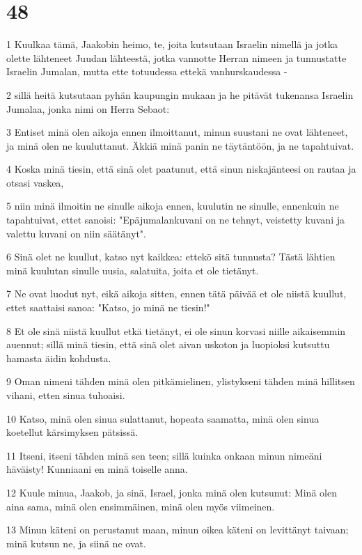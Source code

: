 \chapter{48}

\par 1 Kuulkaa tämä, Jaakobin heimo, te, joita kutsutaan Israelin nimellä ja jotka olette lähteneet Juudan lähteestä, jotka vannotte Herran nimeen ja tunnustatte Israelin Jumalan, mutta ette totuudessa ettekä vanhurskaudessa -
\par 2 sillä heitä kutsutaan pyhän kaupungin mukaan ja he pitävät tukenansa Israelin Jumalaa, jonka nimi on Herra Sebaot:
\par 3 Entiset minä olen aikoja ennen ilmoittanut, minun suustani ne ovat lähteneet, ja minä olen ne kuuluttanut. Äkkiä minä panin ne täytäntöön, ja ne tapahtuivat.
\par 4 Koska minä tiesin, että sinä olet paatunut, että sinun niskajänteesi on rautaa ja otsasi vaskea,
\par 5 niin minä ilmoitin ne sinulle aikoja ennen, kuulutin ne sinulle, ennenkuin ne tapahtuivat, ettet sanoisi: "Epäjumalankuvani on ne tehnyt, veistetty kuvani ja valettu kuvani on niin säätänyt".
\par 6 Sinä olet ne kuullut, katso nyt kaikkea: ettekö sitä tunnusta? Tästä lähtien minä kuulutan sinulle uusia, salatuita, joita et ole tietänyt.
\par 7 Ne ovat luodut nyt, eikä aikoja sitten, ennen tätä päivää et ole niistä kuullut, ettet saattaisi sanoa: "Katso, jo minä ne tiesin!"
\par 8 Et ole sinä niistä kuullut etkä tietänyt, ei ole sinun korvasi niille aikaisemmin auennut; sillä minä tiesin, että sinä olet aivan uskoton ja luopioksi kutsuttu hamasta äidin kohdusta.
\par 9 Oman nimeni tähden minä olen pitkämielinen, ylistykseni tähden minä hillitsen vihani, etten sinua tuhoaisi.
\par 10 Katso, minä olen sinua sulattanut, hopeata saamatta, minä olen sinua koetellut kärsimyksen pätsissä.
\par 11 Itseni, itseni tähden minä sen teen; sillä kuinka onkaan minun nimeäni häväisty! Kunniaani en minä toiselle anna.
\par 12 Kuule minua, Jaakob, ja sinä, Israel, jonka minä olen kutsunut: Minä olen aina sama, minä olen ensimmäinen, minä olen myös viimeinen.
\par 13 Minun käteni on perustanut maan, minun oikea käteni on levittänyt taivaan; minä kutsun ne, ja siinä ne ovat.
